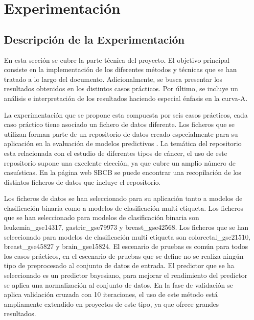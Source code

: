 \section{Experimentación}

\subsection{Descripción de la Experimentación}

En esta sección se cubre la parte técnica del proyecto. El objetivo principal consiste en la implementación de los diferentes métodos y técnicas que se han tratado a lo largo del documento. Adicionalmente, se busca presentar los resultados obtenidos en los distintos casos prácticos. Por último, se incluye un análisis e interpretación de los resultados haciendo especial énfasis en la curva-A.

\bigbreak

La experimentación que se propone esta compuesta por seis casos prácticos, cada caso práctico tiene asociado un fichero de datos diferente. Los ficheros que se utilizan forman parte de un repositorio de datos creado especialmente para su aplicación en la evaluación de modelos predictivos \cite{Feltes2019}. La temática del repositorio esta relacionada con el estudio de diferentes tipos de cáncer, el uso de este repositorio supone una excelente elección, ya que cubre un amplio número de casuísticas. En la página web SBCB \cite{SBCB} se puede encontrar una recopilación de los distintos ficheros de datos que incluye el repositorio. 

\bigbreak

Los ficheros de datos se han seleccionado para su aplicación tanto a modelos de clasificación binaria como a modelos de clasificación multi etiqueta. Los ficheros que se han seleccionado para modelos de clasificación binaria son leukemia\_gse14317, gastric\_gse79973 y breast\_gse42568. Los ficheros que se han seleccionado para modelos de clasificación multi etiqueta son colorectal\_gse21510, breast\_gse45827 y brain\_gse15824. El escenario de pruebas es común para todos los casos prácticos, en el escenario de pruebas que se define no se realiza ningún tipo de preprocesado al conjunto de datos de entrada. El predictor que se ha seleccionado es un predictor bayesiano, para mejorar el rendimiento del predictor se aplica una normalización al conjunto de datos. En la fase de validación se aplica validación cruzada con 10 iteraciones, el uso de este método está ampliamente extendido en proyectos de este tipo, ya que ofrece grandes resultados.


